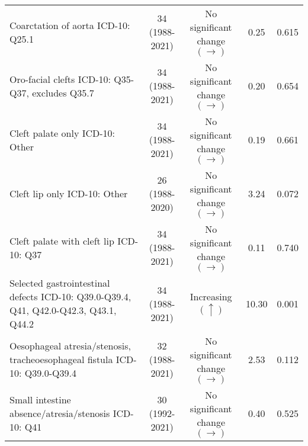 \documentclass[
]{krantz}
\begin{document}
\begin{longtable}[t]{>{\raggedright\arraybackslash}p{4cm}cccc}
Coarctation of aorta\newline  \tiny{ ICD-10: Q25.1} & \makecell[c]{34\\ \tiny{(1988-2021)}} & \makecell[c]{No significant \\ change $\left(\rightarrow \right)$} & 0.25 & 0.615\\
Oro-facial clefts\newline  \tiny{ ICD-10: Q35-Q37, excludes Q35.7} & \makecell[c]{34\\ \tiny{(1988-2021)}} & \makecell[c]{No significant \\ change $\left(\rightarrow \right)$} & 0.20 & 0.654\\
\addlinespace
Cleft palate only\newline  \tiny{ ICD-10: Other} & \makecell[c]{34\\ \tiny{(1988-2021)}} & \makecell[c]{No significant \\ change $\left(\rightarrow \right)$} & 0.19 & 0.661\\
Cleft lip only\newline  \tiny{ ICD-10: Other} & \makecell[c]{26\\ \tiny{(1988-2020)}} & \makecell[c]{No significant \\ change $\left(\rightarrow \right)$} & 3.24 & 0.072\\
Cleft palate with cleft lip\newline  \tiny{ ICD-10: Q37} & \makecell[c]{34\\ \tiny{(1988-2021)}} & \makecell[c]{No significant \\ change $\left(\rightarrow \right)$} & 0.11 & 0.740\\
Selected gastrointestinal defects\newline  \tiny{ ICD-10: Q39.0-Q39.4, Q41, Q42.0-Q42.3, Q43.1, Q44.2} & \makecell[c]{34\\ \tiny{(1988-2021)}} & Increasing $\left(\uparrow \right)$ & 10.30 & 0.001\\
Oesophageal atresia/stenosis, tracheoesophageal fistula\newline  \tiny{ ICD-10: Q39.0-Q39.4} & \makecell[c]{32\\ \tiny{(1988-2021)}} & \makecell[c]{No significant \\ change $\left(\rightarrow \right)$} & 2.53 & 0.112\\
\addlinespace
Small intestine absence/atresia/stenosis\newline  \tiny{ ICD-10: Q41} & \makecell[c]{30\\ \tiny{(1992-2021)}} & \makecell[c]{No significant \\ change $\left(\rightarrow \right)$} & 0.40 & 0.525\\

\end{longtable}
\end{document}
